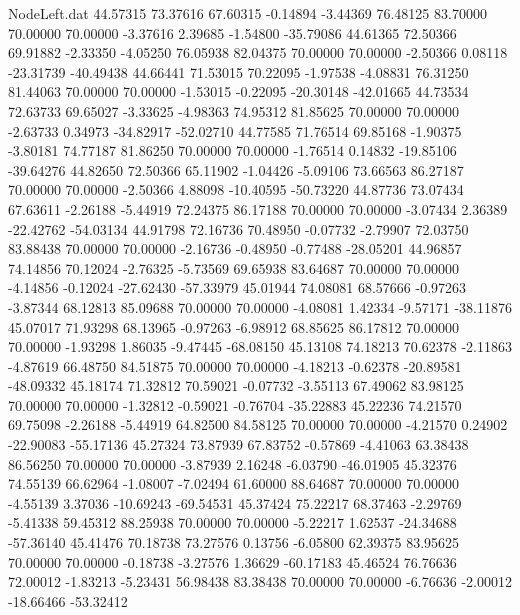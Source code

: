 \begin{filecontents}{NodeLeft.dat}
  44.57315   73.37616   67.60315    -0.14894   -3.44369   76.48125   83.70000   70.00000   70.00000   -3.37616    2.39685   -1.54800  -35.79086
  44.61365   72.50366   69.91882    -2.33350   -4.05250   76.05938   82.04375   70.00000   70.00000   -2.50366    0.08118  -23.31739  -40.49438
  44.66441   71.53015   70.22095    -1.97538   -4.08831   76.31250   81.44063   70.00000   70.00000   -1.53015   -0.22095  -20.30148  -42.01665
  44.73534   72.63733   69.65027    -3.33625   -4.98363   74.95312   81.85625   70.00000   70.00000   -2.63733    0.34973  -34.82917  -52.02710
  44.77585   71.76514   69.85168    -1.90375   -3.80181   74.77187   81.86250   70.00000   70.00000   -1.76514    0.14832  -19.85106  -39.64276
  44.82650   72.50366   65.11902    -1.04426   -5.09106   73.66563   86.27187   70.00000   70.00000   -2.50366    4.88098  -10.40595  -50.73220
  44.87736   73.07434   67.63611    -2.26188   -5.44919   72.24375   86.17188   70.00000   70.00000   -3.07434    2.36389  -22.42762  -54.03134
  44.91798   72.16736   70.48950    -0.07732   -2.79907   72.03750   83.88438   70.00000   70.00000   -2.16736   -0.48950   -0.77488  -28.05201
  44.96857   74.14856   70.12024    -2.76325   -5.73569   69.65938   83.64687   70.00000   70.00000   -4.14856   -0.12024  -27.62430  -57.33979
  45.01944   74.08081   68.57666    -0.97263   -3.87344   68.12813   85.09688   70.00000   70.00000   -4.08081    1.42334   -9.57171  -38.11876
  45.07017   71.93298   68.13965    -0.97263   -6.98912   68.85625   86.17812   70.00000   70.00000   -1.93298    1.86035   -9.47445  -68.08150
  45.13108   74.18213   70.62378    -2.11863   -4.87619   66.48750   84.51875   70.00000   70.00000   -4.18213   -0.62378  -20.89581  -48.09332
  45.18174   71.32812   70.59021    -0.07732   -3.55113   67.49062   83.98125   70.00000   70.00000   -1.32812   -0.59021   -0.76704  -35.22883
  45.22236   74.21570   69.75098    -2.26188   -5.44919   64.82500   84.58125   70.00000   70.00000   -4.21570    0.24902  -22.90083  -55.17136
  45.27324   73.87939   67.83752    -0.57869   -4.41063   63.38438   86.56250   70.00000   70.00000   -3.87939    2.16248   -6.03790  -46.01905
  45.32376   74.55139   66.62964    -1.08007   -7.02494   61.60000   88.64687   70.00000   70.00000   -4.55139    3.37036  -10.69243  -69.54531
  45.37424   75.22217   68.37463    -2.29769   -5.41338   59.45312   88.25938   70.00000   70.00000   -5.22217    1.62537  -24.34688  -57.36140
  45.41476   70.18738   73.27576     0.13756   -6.05800   62.39375   83.95625   70.00000   70.00000   -0.18738   -3.27576    1.36629  -60.17183
  45.46524   76.76636   72.00012    -1.83213   -5.23431   56.98438   83.38438   70.00000   70.00000   -6.76636   -2.00012  -18.66466  -53.32412

\end{filecontents}
